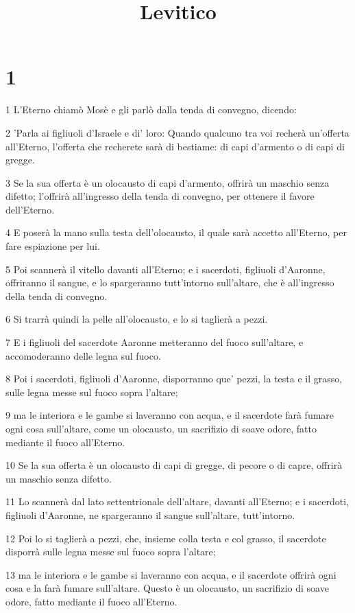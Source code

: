 

\title{Levitico}


\chapter{1}

\par 1 L'Eterno chiamò Mosè e gli parlò dalla tenda di convegno, dicendo:
\par 2 'Parla ai figliuoli d'Israele e di' loro: Quando qualcuno tra voi recherà un'offerta all'Eterno, l'offerta che recherete sarà di bestiame: di capi d'armento o di capi di gregge.
\par 3 Se la sua offerta è un olocausto di capi d'armento, offrirà un maschio senza difetto; l'offrirà all'ingresso della tenda di convegno, per ottenere il favore dell'Eterno.
\par 4 E poserà la mano sulla testa dell'olocausto, il quale sarà accetto all'Eterno, per fare espiazione per lui.
\par 5 Poi scannerà il vitello davanti all'Eterno; e i sacerdoti, figliuoli d'Aaronne, offriranno il sangue, e lo spargeranno tutt'intorno sull'altare, che è all'ingresso della tenda di convegno.
\par 6 Si trarrà quindi la pelle all'olocausto, e lo si taglierà a pezzi.
\par 7 E i figliuoli del sacerdote Aaronne metteranno del fuoco sull'altare, e accomoderanno delle legna sul fuoco.
\par 8 Poi i sacerdoti, figliuoli d'Aaronne, disporranno que' pezzi, la testa e il grasso, sulle legna messe sul fuoco sopra l'altare;
\par 9 ma le interiora e le gambe si laveranno con acqua, e il sacerdote farà fumare ogni cosa sull'altare, come un olocausto, un sacrifizio di soave odore, fatto mediante il fuoco all'Eterno.
\par 10 Se la sua offerta è un olocausto di capi di gregge, di pecore o di capre, offrirà un maschio senza difetto.
\par 11 Lo scannerà dal lato settentrionale dell'altare, davanti all'Eterno; e i sacerdoti, figliuoli d'Aaronne, ne spargeranno il sangue sull'altare, tutt'intorno.
\par 12 Poi lo si taglierà a pezzi, che, insieme colla testa e col grasso, il sacerdote disporrà sulle legna messe sul fuoco sopra l'altare;
\par 13 ma le interiora e le gambe si laveranno con acqua, e il sacerdote offrirà ogni cosa e la farà fumare sull'altare. Questo è un olocausto, un sacrifizio di soave odore, fatto mediante il fuoco all'Eterno.
